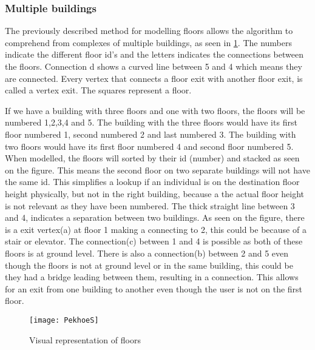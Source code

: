 \subsubsection{Multiple buildings}

The previously described method for modelling floors allows the algorithm to comprehend from complexes of multiple buildings, as seen in \cref{fig:PekhoeS}. The numbers indicate the different floor id's and the letters indicates the connections between the floors. Connection d shows a curved line between 5 and 4 which means they are connected. Every vertex that connects a floor exit with another floor exit, is called a vertex exit\label{e_vertex}. The squares represent a floor.\newline

If we have a building with three floors and one with two floors, the floors will be numbered 1,2,3,4 and 5. The building with the three floors would have its first floor numbered 1, second numbered 2 and last numbered 3. The building with two floors would have its first floor numbered 4 and second floor numbered 5. When modelled, the floors will sorted by their id (number) and stacked as seen on the figure. This means the second floor on two separate buildings will not have the same id. This simplifies a lookup if an individual is on the destination floor height physically, but not in the right building, because a the actual floor height is not relevant as they have been numbered. The thick straight line between 3 and 4, indicates a separation between two buildings. As seen on the figure, there is a exit vertex(a) at floor 1 making a connecting to 2, this could be because of a stair or elevator. The connection(c) between 1 and 4 is possible as both of these floors is at ground level. There is also a connection(b) between 2 and 5 even though the floors is not at ground level or in the same building, this could be they had a bridge leading between them, resulting in a connection. This allows for an exit from one building to another even though the user is not on the first floor. 
\begin{figure}[ht!]
    \centering
    \texttt{[image: PekhoeS]}
    \caption{Visual representation of floors}
    \label{fig:PekhoeS}
  \end{figure}
